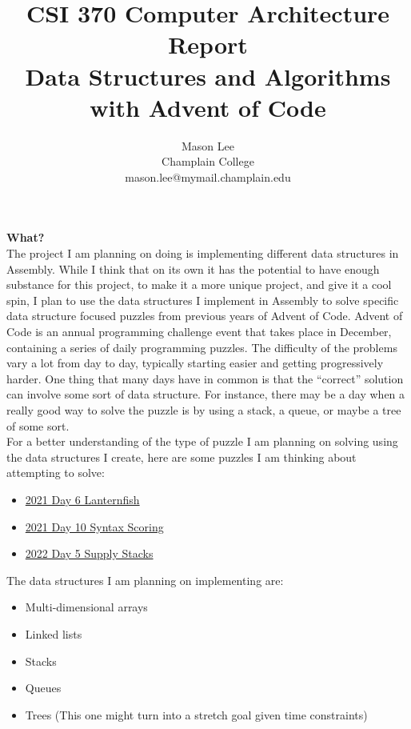 \documentclass[twoside]{article}
\date{}
\begin{document}
\title{CSI 370 Computer Architecture Report\\ Data Structures and Algorithms with Advent of Code}
\author{Mason Lee \\
Champlain College\\
mason.lee@mymail.champlain.edu}
\maketitle
\renewcommand{\labelitemi}{$\diamond$}
\noindent\textbf{What?}\\
\noindent The project I am planning on doing is implementing different data structures in Assembly. While I think that on its own it has the potential to have enough substance for this project, to make it a more unique project, and give it a cool spin, I plan to use the data structures I implement in Assembly to solve specific data structure focused puzzles from previous years of Advent of Code. Advent of Code is an annual programming challenge event that takes place in December, containing a series of daily programming puzzles. The difficulty of the problems vary a lot from day to day, typically starting easier and getting progressively harder. One thing that many days have in common is that the “correct” solution can involve some sort of data structure. For instance, there may be a day when a really good way to solve the puzzle is by using a stack, a queue, or maybe a tree of some sort. \\

\noindent For a better understanding of the type of puzzle I am planning on solving using the data structures I create, here are some puzzles I am thinking about attempting to solve:
\begin{itemize}
    \item \href{https://adventofcode.com/2021/day/6}{2021 Day 6 Lanternfish}
    \item \href{https://adventofcode.com/2021/day/10}{2021 Day 10 Syntax Scoring}
    \item \href{https://adventofcode.com/2022/day/5}{2022 Day 5 Supply Stacks}
\end{itemize}

\noindent The data structures I am planning on implementing are:
\begin{itemize}
    \item Multi-dimensional arrays
    \item Linked lists
    \item Stacks
    \item Queues
    \item Trees (This one might turn into a stretch goal given time constraints)
\end{itemize}
\end{document}
